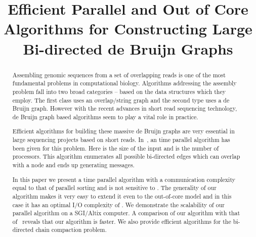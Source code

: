\documentclass[11pt,conference,twocolumn]{IEEEtran}
\begin{document}
\title{Efficient Parallel and Out of Core Algorithms for Constructing Large Bi-directed de Bruijn Graphs}


\author{
}







\maketitle               

\begin{abstract}
Assembling genomic sequences from a set of overlapping reads is one of the
most fundamental problems in computational biology. Algorithms addressing the
assembly problem fall into two broad categories -- based on the data structures
which they employ. The first class uses an overlap/string graph and the second 
type uses a de Bruijn graph. However with the recent advances in short read 
sequencing technology, de Bruijn graph based algorithms seem to play a vital role in 
practice. 

Efficient algorithms for building these massive de Bruijn graphs are very essential 
in large sequencing projects based on short reads. In~\cite{par_bidirected_graph}, an  time parallel algorithm has been given for this problem. Here  is the size of the input and  is the number of processors. This algorithm enumerates all possible bi-directed
edges which can overlap with a node and ends up generating  messages. 

In this paper we  present a  time parallel algorithm with a 
communication complexity equal to that of parallel sorting and is not sensitive to . 
The generality of our algorithm makes it very easy to extend it even to the 
out-of-core model and in this case it has an optimal I/O complexity of . 
We demonstrate the scalability of our parallel algorithm on a SGI/Altix computer. A comparison of our algorithm with that of~\cite{par_bidirected_graph} reveals that our algorithm is faster. We also provide efficient algorithms for the
bi-directed chain compaction problem.
\end{abstract}
\end{document}
